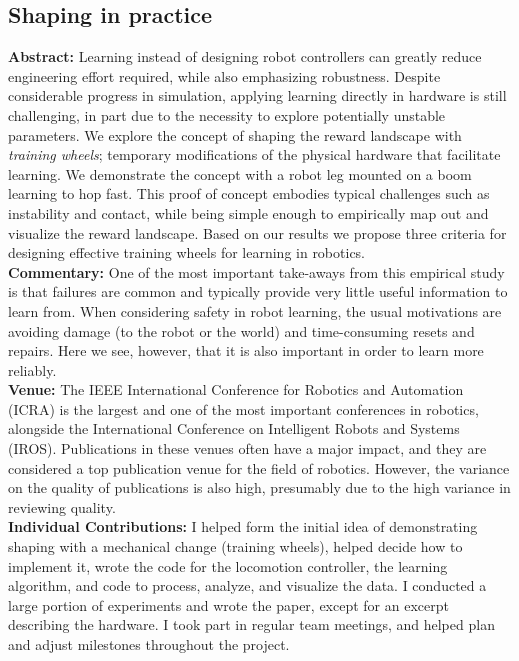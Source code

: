 \subsection{Shaping in practice}
\textbf{Abstract: }
Learning instead of designing robot controllers can greatly reduce engineering effort required, while also emphasizing robustness. Despite considerable progress in simulation, applying learning directly in hardware is still challenging, in part due to the necessity to explore potentially unstable parameters. We explore the concept of shaping the reward landscape with \emph{training wheels}; temporary modifications of the physical hardware that facilitate learning. We demonstrate the concept with a robot leg mounted on a boom learning to hop fast. This proof of concept embodies typical challenges such as instability and contact, while being simple enough to empirically map out and visualize the reward landscape. Based on our results we propose three criteria for designing effective training wheels for learning in robotics. \\
\textbf{Commentary: }
One of the most important take-aways from this empirical study is that failures are common and typically provide very little useful information to learn from. When considering safety in robot learning, the usual motivations are avoiding damage (to the robot or the world) and time-consuming resets and repairs. Here we see, however, that it is also important in order to learn more reliably. \\
\textbf{Venue: }
The IEEE International Conference for Robotics and Automation (ICRA) is the largest and one of the most important conferences in robotics, alongside the International Conference on Intelligent Robots and Systems (IROS). Publications in these venues often have a major impact, and they are considered a top publication venue for the field of robotics. However, the variance on the quality of publications is also high, presumably due to the high variance in reviewing quality. \\
\textbf{Individual Contributions: }
I helped form the initial idea of demonstrating shaping with a mechanical change (training wheels), helped decide how to implement it, wrote the code for the locomotion controller, the learning algorithm, and code to process, analyze, and visualize the data. I conducted a large portion of experiments and wrote the paper, except for an excerpt describing the hardware. I took part in regular team meetings, and helped plan and adjust milestones throughout the project.
